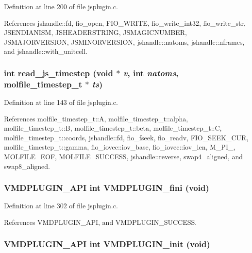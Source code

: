 Definition at line 200 of file jsplugin.c.

References jshandle::fd, fio\_\-open, FIO\_\-WRITE, fio\_\-write\_\-int32, fio\_\-write\_\-str, JSENDIANISM, JSHEADERSTRING, JSMAGICNUMBER, JSMAJORVERSION, JSMINORVERSION, jshandle::natoms, jshandle::nframes, and jshandle::with\_\-unitcell.
\subsubsection{\setlength{\rightskip}{0pt plus 5cm}int read\_\-js\_\-timestep (void $\ast$ {\em v}, int {\em natoms}, {\bf molfile\_\-timestep\_\-t} $\ast$ {\em ts})\hspace{0.3cm}{\tt  [static]}}\label{jsplugin_8c_a12}




Definition at line 143 of file jsplugin.c.

References molfile\_\-timestep\_\-t::A, molfile\_\-timestep\_\-t::alpha, molfile\_\-timestep\_\-t::B, molfile\_\-timestep\_\-t::beta, molfile\_\-timestep\_\-t::C, molfile\_\-timestep\_\-t::coords, jshandle::fd, fio\_\-fseek, fio\_\-readv, FIO\_\-SEEK\_\-CUR, molfile\_\-timestep\_\-t::gamma, fio\_\-iovec::iov\_\-base, fio\_\-iovec::iov\_\-len, M\_\-PI\_, MOLFILE\_\-EOF, MOLFILE\_\-SUCCESS, jshandle::reverse, swap4\_\-aligned, and swap8\_\-aligned.
\subsubsection{\setlength{\rightskip}{0pt plus 5cm}VMDPLUGIN\_\-API int VMDPLUGIN\_\-fini (void)}\label{jsplugin_8c_a19}




Definition at line 302 of file jsplugin.c.

References VMDPLUGIN\_\-API, and VMDPLUGIN\_\-SUCCESS.
\subsubsection{\setlength{\rightskip}{0pt plus 5cm}VMDPLUGIN\_\-API int VMDPLUGIN\_\-init (void)}\label{jsplugin_8c_a17}




